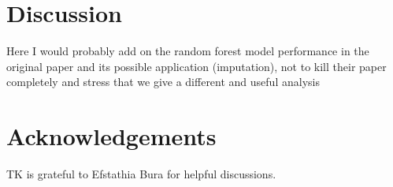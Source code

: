 \documentclass[12pt]{article}
\newcommand{\biblist}{


}
\begin{document}
\label{subsec:stat_model}
\section{Discussion}
{\color{red} Here I would probably add on the random forest model performance in the original paper and its possible application (imputation), not to kill their paper completely and stress that we give a different and useful analysis}
\label{sec:discussion}


\section*{Acknowledgements}
TK is grateful to Efstathia Bura for helpful discussions.

\begin{appendix}
\label{appendix}
\end{appendix}

\biblist
\end{document}
